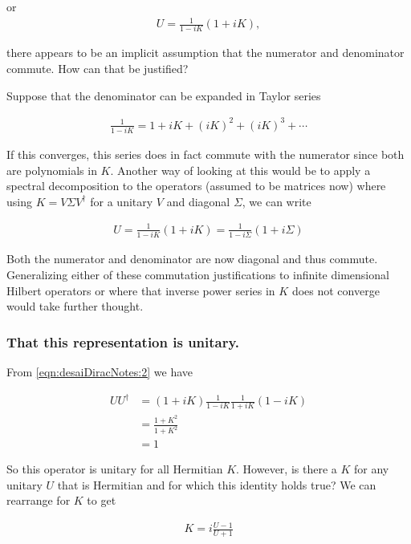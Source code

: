 or
\begin{align*}
U = \frac{1}{1-iK}(1 + iK),
\end{align*}

there appears to be an implicit assumption that the numerator and denominator commute.  How can that be justified?

Suppose that the denominator can be expanded in Taylor series

\begin{align*}
\frac{1}{1-iK} = 1 + iK + (iK)^2 + (iK)^3 + \cdots
\end{align*}

If this converges, this series does in fact commute with the numerator since both are polynomials in $K$.  Another way of looking at this would be to apply a spectral decomposition to the operators (assumed to be matrices now) where using $K = V \Sigma V^\dagger$ for a unitary $V$ and diagonal $\Sigma$, we can write

\begin{align*}
U = \frac{1}{1-iK}(1 + iK) = \frac{1}{1-i \Sigma}(1 + i \Sigma)
\end{align*}

Both the numerator and denominator are now diagonal and thus commute.  Generalizing either of these commutation justifications to infinite dimensional Hilbert operators or where that inverse power series in $K$ does not converge would take further thought.

\subsubsection{That this representation is unitary.}

From \ref{eqn:desaiDiracNotes:2} we have

\begin{align*}
U U^\dagger 
&= (1 + iK)\frac{1}{1-iK} \frac{1}{1+iK} (1 - iK) \\
&= \frac{1 + K^2}{1+K^2} \\
&= 1
\end{align*}

So this operator is unitary for all Hermitian $K$.  However, is there a $K$ for any unitary $U$ that is Hermitian and for which this identity holds true?  We can rearrange for $K$ to get

\begin{align}\label{eqn:desaiDiracNotes:3}
K = i \frac{ U - 1 }{U + 1}
\end{align}

